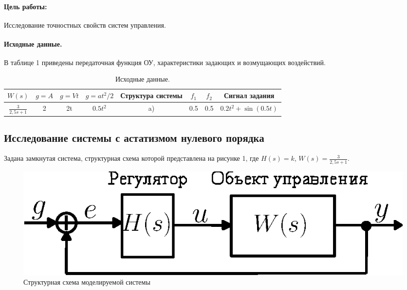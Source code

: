 \documentclass[12pt,a4paper]{article}
\begin{document}


\paragraph{Цель работы:}Исследование точностных свойств систем управления.%
\paragraph{Исходные данные.} В таблице 1 приведены передаточная функция ОУ, характеристики задающих и возмущающих воздействий.
\begin{table}[h!]
	\caption{Исходные данные.}
	\renewcommand{\arraystretch}{1.8} %
	\begin{tabular}{|c|c|c|c|c|c|c|c|}
		\hline $W(s)$ & $g = A$ & $g = Vt$ & $g = at^2/2$ & Структура системы & $f_1$ & $f_2$ & Сигнал задания\\
		\hline $\displaystyle{\frac{3}{2,5s + 1}}$ & 2 & 2t & $0.5t^2$ & a) & 0.5 & 0.5 & $0.2t^2 + \sin{(0.5t)}$\\
		\hline
	\end{tabular}	
\end{table} 

\newpage
\begin{center}
\section{Исследование системы с астатизмом нулевого порядка}
\end{center}
Задана замкнутая система, структурная схема которой представлена на рисунке 1, где $H(s) = k$, $W(s)=\displaystyle{\frac{3}{2,5s + 1}}$.
\begin{figure}[h!]
	\centering
	\includegraphics[width=0.6\linewidth]{cxema0.eps}
	\caption{Структурная схема моделируемой системы}
\end{figure}
\end{document}
